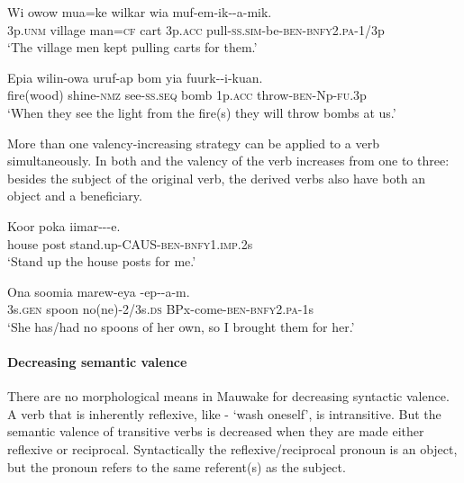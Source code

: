 \ea%
\label{ex:3:x1004}
\gll Wi owow mua=ke wilkar wia muf-em-ik--a-mik.\\
3p.\textsc{unm} village man=\textsc{cf} cart 3p.\textsc{acc} pull-\textsc{ss}.\textsc{sim}-be-\textsc{ben}-\textsc{bnfy}2.\textsc{pa}-1/3p\\
\glt`The village men kept pulling carts for them.'
\z

\ea%
\label{ex:3:x1005}
\gll Epia wilin-owa uruf-ap bom yia fuurk--i-kuan.\\
fire(wood) shine-\textsc{nmz} see-\textsc{ss}.\textsc{seq} bomb 1p.\textsc{acc} throw-\textsc{ben}-Np-\textsc{fu}.3p\\
\glt`When they see the light from the fire(s) they will throw bombs at us.'
\z

More than one valency-increasing strategy can be applied to a verb simultaneously. In both  and  the valency of the verb increases from one to three: besides the subject of the original verb, the derived verbs also have both an object and a beneficiary.

\ea%
\label{ex:3:x1007}
\gll Koor poka iimar---e. \\
house post stand.up-CAUS-\textsc{ben}-\textsc{bnfy}1.\textsc{imp}.2s\\
\glt`Stand up the house posts for me.'
\z

\ea%
\label{ex:3:x1008}
\gll Ona soomia marew-eya -ep--a-m. \\
3s.\textsc{gen} spoon no(ne)-2/3s.\textsc{ds} BPx-come-\textsc{ben}-\textsc{bnfy}2.\textsc{pa}-1s\\
\glt`She has/had no spoons of her own, so I brought them for her.'
\z

\paragraph{Decreasing semantic valence}\label{sec:3:a:z:y:x}
{}
There are no morphological means in Mauwake for decreasing syntactic valence. A verb that is inherently reflexive, like - `wash oneself', is intransitive. But the semantic valence of transitive verbs is decreased when they are made either reflexive or reciprocal. Syntactically the reflexive/reciprocal pronoun is an object, but the pronoun refers to the same referent(s) as the subject. 

